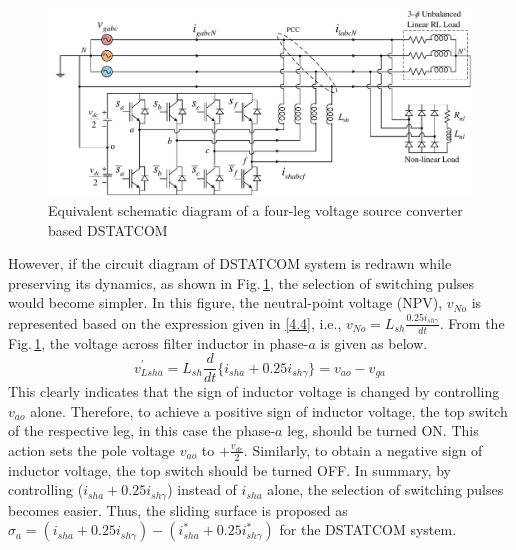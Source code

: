 \begin{figure}[]\centering
	\includegraphics[scale=0.72	]{figures/Appendix/4leg_DSTATCOM1.pdf}
	\caption{\small Equivalent schematic diagram of a four-leg voltage source converter based DSTATCOM} %
	\label{A1.fig1}
\end{figure} 
However, if the circuit diagram of DSTATCOM system is redrawn while preserving its dynamics, as shown in Fig.\,\ref{A1.fig1}, the selection of switching pulses would become simpler. In this figure, the neutral-point voltage (NPV), $v_{No}$ is represented based on the expression given in \eqref{4.4}, i.e., $v_{No} = L_{sh} \frac{0.25i_{sh\gamma}}{dt}.$ From the Fig.\,\ref{A1.fig1}, the voltage across filter inductor in phase-$a$ is given as below.
\begin{equation}
v^\prime_{Lsha} = L_{sh}\frac{d}{dt}\Big\{ i_{sha} + 0.25 i_{sh\gamma} \Big\} = v_{ao} - v_{ga}
\end{equation}
This clearly indicates that the sign of inductor voltage is changed by controlling $v_{ao}$ alone. Therefore, to achieve a positive sign of inductor voltage, the top switch of the respective leg, in this case the phase-$a$ leg, should be turned ON. This action sets the pole voltage $v_{ao}$ to $+\frac{v_{dc}}{2}$. Similarly, to obtain a negative sign of inductor voltage, the top switch should be turned OFF. 
In summary, by controlling ($i_{sha} + 0.25 i_{sh\gamma}$) instead of $i_{sha}$ alone, the selection of switching pulses becomes easier. Thus, the sliding surface is proposed as $\sigma_{a} = (i_{sha}+0.25i_{sh\gamma}) - (i^{*}_{sha}+0.25i^{*}_{sh\gamma})$ for the DSTATCOM system. 

